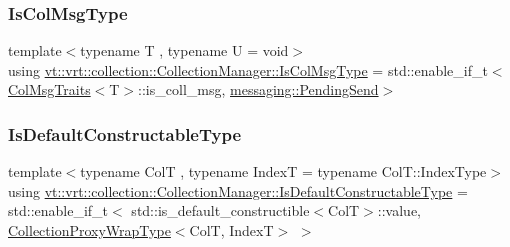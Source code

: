 \subsubsection{\texorpdfstring{Is\+Col\+Msg\+Type}{IsColMsgType}}
{\footnotesize\ttfamily template$<$typename T , typename U  = void$>$ \\
using \hyperlink{structvt_1_1vrt_1_1collection_1_1_collection_manager_a21c21612c806016788057aeab142af20}{vt\+::vrt\+::collection\+::\+Collection\+Manager\+::\+Is\+Col\+Msg\+Type} =  std\+::enable\+\_\+if\+\_\+t$<$\hyperlink{structvt_1_1vrt_1_1collection_1_1_col_msg_traits}{Col\+Msg\+Traits}$<$T$>$\+::is\+\_\+coll\+\_\+msg, \hyperlink{structvt_1_1messaging_1_1_pending_send}{messaging\+::\+Pending\+Send}$>$}

\mbox{\label{structvt_1_1vrt_1_1collection_1_1_collection_manager_af8091fcb8218dad155ea028c9b5d283f}} 
\subsubsection{\texorpdfstring{Is\+Default\+Constructable\+Type}{IsDefaultConstructableType}}
{\footnotesize\ttfamily template$<$typename ColT , typename IndexT  = typename Col\+T\+::\+Index\+Type$>$ \\
using \hyperlink{structvt_1_1vrt_1_1collection_1_1_collection_manager_af8091fcb8218dad155ea028c9b5d283f}{vt\+::vrt\+::collection\+::\+Collection\+Manager\+::\+Is\+Default\+Constructable\+Type} =  std\+::enable\+\_\+if\+\_\+t$<$ std\+::is\+\_\+default\+\_\+constructible$<$ColT$>$\+::value, \hyperlink{structvt_1_1vrt_1_1collection_1_1_collection_manager_a56458ed7f9bb22b631b9b3a745f42f94}{Collection\+Proxy\+Wrap\+Type}$<$ColT, IndexT$>$ $>$}

\mbox{\label{structvt_1_1vrt_1_1collection_1_1_collection_manager_ae376deeefd4f89a0b1c93849977715d9}} 
